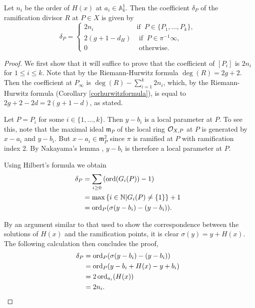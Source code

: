     \begin{lem}\label{char2ramification}
    Let $n_i$ be the order of $H(x)$ at $a_i\in \mathbb A_k^1$.
    Then the coefficient $\delta_P$ of the ramification divisor $R$ at $P\in X$ is given by
        \[
        \delta_P = \left\{
            \begin{array}{ll}
            2n_i & \text{if }\ P\in \{P_1,\ldots ,P_k\}, \\
            2(g+1-d_H) & \text{ if }\  P \in \pi^{-1}\infty, \\
            0 & \text{ otherwise.} 
            \end{array}
        \right.
        \]
    \end{lem}
    \begin{proof}
    We first show that it will suffice to prove that the coefficient of $[P_i]$ is $2n_i$ for $1\leq i \leq k$.
    Note that by the Riemann-Hurwitz formula $\deg(R) = 2g+2$.
    Then the coefficient at $P_\infty$ is $\deg(R) - \sum_{i=1}^k2n_i$, which, by the Riemann-Hurwitz formula (Corollary \ref{corhurwitzformula}), is equal to $2g+2-2d = 2(g+1-d)$, as stated.
    
    Let $P=P_i$ for some $i\in \{1,\ldots , k\}$.
    Then $y-b_i$ is a local parameter at $P$.
    To see this, note that the maximal ideal $\mathfrak m_{P}$ of the local ring ${\cal O}_{X,P}$ at $P$ is generated by $x-a_i$ and $y-b_i$.
    But $x-a_i\in \mathfrak m_{P}^2$ since $\pi$ is ramified at $P$ with ramification index 2.
    By Nakayama's lemma \cite[Prop. 2.6]{atiyahmacdonald}, $y-b_i$ is therefore a local parameter at $P$.
    
    Using Hilbert's formula \cite[Chap. IV, \S 1, Prop. 4]{localfields} we obtain
        \begin{align*}
        \delta_P & =  \sum_{i\geq 0} \left(\operatorname{ord}(G_i(P))-1\right) \\
        & =  \max\left\{ i\in {\mathbb N} | G_i(P)\neq \{1\}\right\} + 1 \\
        & =  \operatorname{ord}_{P}(\sigma(y-b_i) - (y-b_i)).
        \end{align*}
    
    By an argument similar to that used to show the correspondence between the solutions of $H(x)$ and the ramification points, it is clear $\sigma(y)=y+H(x)$.
    The following calculation then concludes the proof,
        \begin{align*}
        \delta_P & =  \operatorname{ord}_{P}(\sigma(y-b_i) - (y-b_i)) \\
        & =  \operatorname{ord}_{P}(y-b_i+H(x) - y + b_i) \\
        & =  2\operatorname{ord}_{a_i}(H(x)) \\
        & =  2n_i.
        \end{align*}
    \end{proof}




